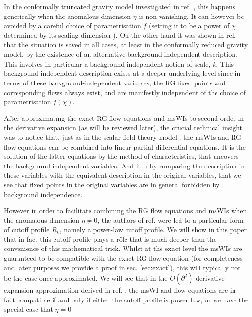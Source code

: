 \documentclass[11pt]{book} %
\begin{document}
In the conformally truncated gravity model investigated in ref.  \cite{Dietz:2015owa}, this happens generically when the anomalous dimension $\eta$ is non-vanishing.
It can however be avoided by a careful choice of parametrisation $f$ (setting it to be a power of $\chi$ determined by its scaling dimension \cite{Dietz:2015owa}).
On the other hand it was shown in ref. \cite{Dietz:2015owa} that the situation is saved in all cases, at least in the conformally reduced gravity model, by the existence of an alternative background-independent description. This involves in particular a background-independent notion of scale, $\hat{k}$. This background independent description exists at a deeper underlying level since in terms of these background-independent variables, the RG fixed points and corresponding flows always exist, and are manifestly independent of the choice of parametrisation $f(\chi)$.  

After approximating the exact RG flow equations and msWIs to second order in the derivative expansion (as will be reviewed later), 
the crucial technical insight was to notice that, just as in the scalar field theory model \cite{Bridle:2013sra}, the msWIs and RG flow equations can be combined into linear partial differential equations. It is the solution of the latter equations by the method of characteristics, that uncovers the background independent variables. And it is by comparing the description in these variables with the equivalent description in the original variables,
that we see that fixed points in the original variables are in general forbidden by  background independence.

However in order to facilitate combining the RG flow equations and msWIs when the anomalous dimension $\eta\ne0$, the authors of ref. \cite{Dietz:2015owa} were led to a particular form of cutoff profile $R_k$, namely a power-law cutoff profile. We will show in this paper that in fact this cutoff profile plays a r\^ole that is much deeper than the convenience of this mathematical trick. 
Whilst at the exact level the msWIs are guaranteed to be compatible with the exact RG flow equation (for completeness and later purposes we provide a proof in sec. \ref{sec:exact}), this will typically not be the case once approximated. 
We will see that in the $O(\partial^2)$ derivative expansion approximation derived in ref. \cite{Dietz:2015owa}, the msWI and flow equations are in fact compatible {if and only if} either the cutoff profile is power law, or we have the special case that $\eta=0$.
\end{document}
